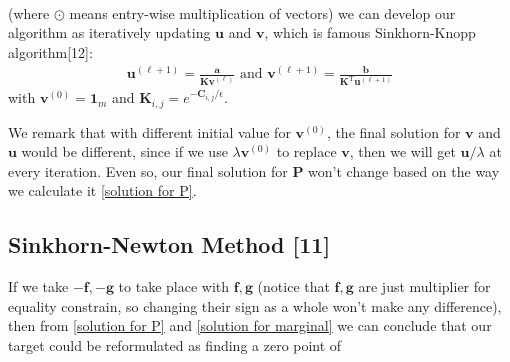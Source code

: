 \documentclass{article}
\begin{document}
\begin{large}
\begin{align}
\label{solution for marginal}
\end{align}
(where $\odot$ means entry-wise multiplication of vectors) we can develop our algorithm as iteratively updating $\mathbf { u }$ and $\mathbf { v }$, which is famous Sinkhorn-Knopp algorithm[12]:
\begin{align}
\mathbf { u } ^ { ( \ell + 1 ) }  { = } \frac { \mathbf { a } } { \mathbf { K } \mathbf { v } ^ { ( \ell ) } } \text { and } \mathbf { v } ^ { ( \ell + 1 ) } { = } \frac { \mathbf { b } } { \mathbf { K } ^ { \mathrm { T } } \mathbf { u } ^ { ( \ell + 1 ) } }
\end{align}
with $\mathbf { v } ^ { ( 0 ) } = \mathbf { 1 } _ { m }$ and $\mathbf { K } _ { i , j } = e^{-\mathbf{C}_{i,j}/\epsilon}$.

We remark that with different initial value for $\mathbf { v } ^ { ( 0 ) }$, the final solution for $\mathbf { v } $ and $\mathbf { u } $ would be different, since if we use $\lambda\mathbf { v } ^{(0)}$ to replace $\mathbf { v } $, then we will get  $\mathbf { u }/\lambda $ at every iteration. Even so, our final solution for $\mathbf{P}$ won't change based on the way we calculate it \ref{solution for P}.
\subsection{Sinkhorn-Newton Method [11]}
If we take $-\mathbf{f}, -\mathbf{g}$ to take place with $\mathbf{f}, \mathbf{g}$ (notice that $\mathbf{f}, \mathbf{g}$ are just multiplier for equality constrain, so changing their sign as a whole won't make any difference), then from \ref{solution for P} and \ref{solution for marginal} we can conclude that our target could be reformulated as finding a zero point of


\end{large}
\end{document}
